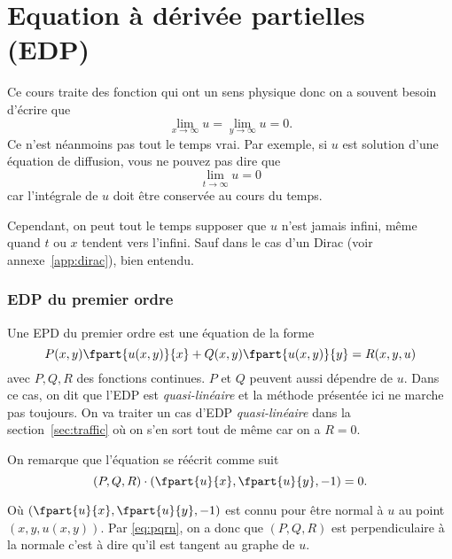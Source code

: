 


\DeclareMathOperator{\res}{Res}


\part{Equation à dérivée partielles (EDP)}
\begin{myrem}
  Ce cours traite des fonction qui ont un sens physique donc
  on a souvent besoin d'écrire que
  \[ \lim_{x\to\infty} u = \lim_{y\to\infty} u = 0. \]
  Ce n'est néanmoins pas tout le temps vrai.
  Par exemple, si $u$ est solution d'une équation de diffusion,
  vous ne pouvez pas dire que
  \[ \lim_{t\to\infty} u = 0 \]
  car l'intégrale de $u$ doit être conservée au cours du temps.

  Cependant, on peut tout le temps supposer que $u$ n'est jamais
  infini, même quand $t$ ou $x$ tendent vers l'infini.
  Sauf dans le cas d'un Dirac (voir annexe~\ref{app:dirac}), bien entendu.
\end{myrem}
\section{EDP du premier ordre}
Une EPD du premier ordre est une équation de la forme
\[ P(x, y)\fpart{u(x, y)}{x}
  + Q(x, y)\fpart{u(x, y)}{y}
  = R(x, y, u) \]
avec $P, Q, R$ des fonctions continues. %
$P$ et $Q$ peuvent aussi dépendre de $u$.
Dans ce cas,
on dit que l'EDP est \emph{quasi-linéaire} et
la méthode présentée ici ne marche pas toujours.
On va traiter un cas d'EDP \emph{quasi-linéaire}
dans la section~\ref{sec:traffic} où on s'en sort tout de même
car on a $R = 0$.

On remarque que l'équation se réécrit comme suit
\begin{equation}
  \label{eq:pqrn}
  \left(P, Q, R\right) \cdot \left(
  \fpart{u}{x}, \fpart{u}{y}, -1\right) = 0.
\end{equation}

Où $\left(\fpart{u}{x}, \fpart{u}{y}, -1\right)$ est connu pour être normal
à $u$ au point $\left(x, y, u(x, y)\right)$.
Par \eqref{eq:pqrn}, on a donc que $(P, Q, R)$ est perpendiculaire à la normale
c'est à dire qu'il est tangent au graphe de $u$.

